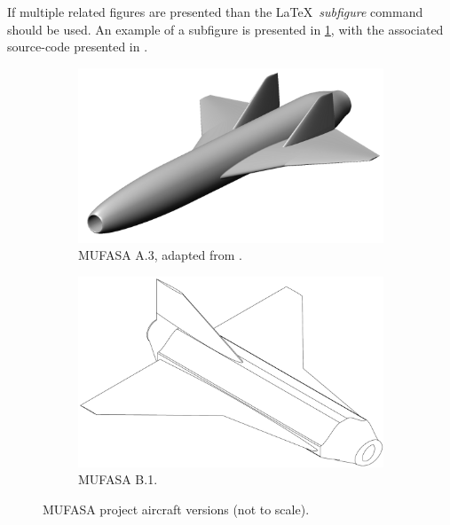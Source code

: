 If multiple related figures are presented than the \LaTeX\ \textit{subfigure} command should be used. 
An example of a subfigure is presented in \cref{fig:aircraftComparison}, with the associated source-code presented in . 

\begin{figure}[hbt!]
	\centering
	\begin{subfigure}{0.48\textwidth}
		\centering
		\captionsetup{width=0.95\linewidth}
		\includegraphics[width=0.95\linewidth]{Photos/Aircraft/MUFASA_Gair}
		\caption{MUFASA A.3, adapted from \citeauthor{ShaunThesis} \cite{ShaunThesis}.}
	\end{subfigure}
	\begin{subfigure}{0.48\textwidth}
		\centering
		\captionsetup{width=0.95\linewidth}
		\includegraphics[width=0.95\linewidth]{Photos/Aircraft/MUFASA_ISO}
		\caption{MUFASA B.1.}
	\end{subfigure}
	\caption{MUFASA project aircraft versions (not to scale). \label{fig:aircraftComparison}}
\end{figure}

